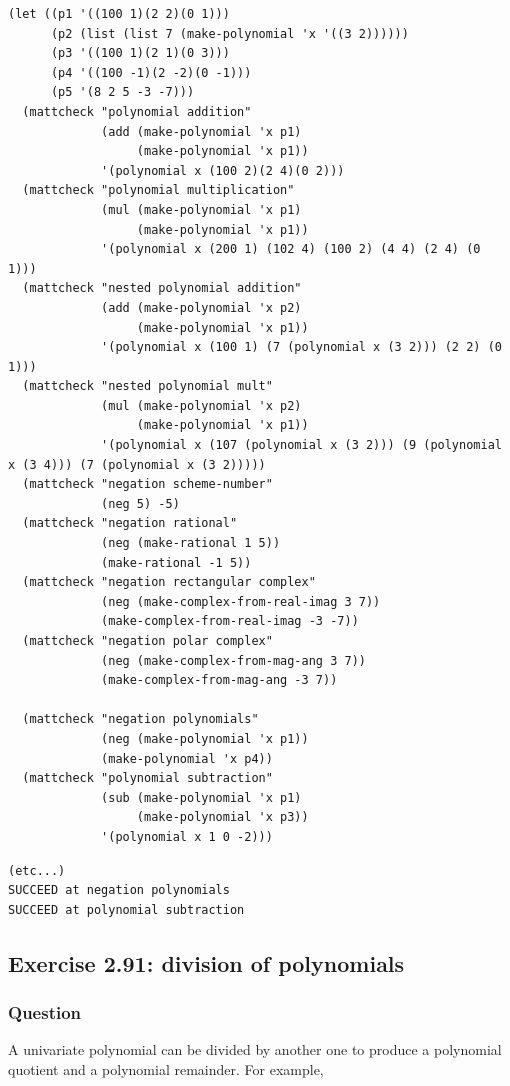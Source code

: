 \documentclass[final,fleqn,titlepage,twoside]{article}
\begin{document}
\begin{verbatim}
(let ((p1 '((100 1)(2 2)(0 1)))
      (p2 (list (list 7 (make-polynomial 'x '((3 2))))))
      (p3 '((100 1)(2 1)(0 3)))
      (p4 '((100 -1)(2 -2)(0 -1)))
      (p5 '(8 2 5 -3 -7)))
  (mattcheck "polynomial addition"
             (add (make-polynomial 'x p1)
                  (make-polynomial 'x p1))
             '(polynomial x (100 2)(2 4)(0 2)))
  (mattcheck "polynomial multiplication"
             (mul (make-polynomial 'x p1)
                  (make-polynomial 'x p1))
             '(polynomial x (200 1) (102 4) (100 2) (4 4) (2 4) (0 1)))
  (mattcheck "nested polynomial addition"
             (add (make-polynomial 'x p2)
                  (make-polynomial 'x p1))
             '(polynomial x (100 1) (7 (polynomial x (3 2))) (2 2) (0 1)))
  (mattcheck "nested polynomial mult"
             (mul (make-polynomial 'x p2)
                  (make-polynomial 'x p1))
             '(polynomial x (107 (polynomial x (3 2))) (9 (polynomial x (3 4))) (7 (polynomial x (3 2)))))
  (mattcheck "negation scheme-number"
             (neg 5) -5)
  (mattcheck "negation rational"
             (neg (make-rational 1 5))
             (make-rational -1 5))
  (mattcheck "negation rectangular complex"
             (neg (make-complex-from-real-imag 3 7))
             (make-complex-from-real-imag -3 -7))
  (mattcheck "negation polar complex"
             (neg (make-complex-from-mag-ang 3 7))
             (make-complex-from-mag-ang -3 7))

  (mattcheck "negation polynomials"
             (neg (make-polynomial 'x p1))
             (make-polynomial 'x p4))
  (mattcheck "polynomial subtraction"
             (sub (make-polynomial 'x p1)
                  (make-polynomial 'x p3))
             '(polynomial x 1 0 -2)))
\end{verbatim}

\begin{verbatim}
(etc...)
SUCCEED at negation polynomials
SUCCEED at polynomial subtraction
\end{verbatim}

\subsection{Exercise 2.91: division of polynomials}
\label{sec:org00c212c}
\subsubsection{Question}
\label{sec:orgbae0113}
A univariate polynomial can be divided by another one to produce a polynomial
quotient and a polynomial remainder. For example,
\end{document}
